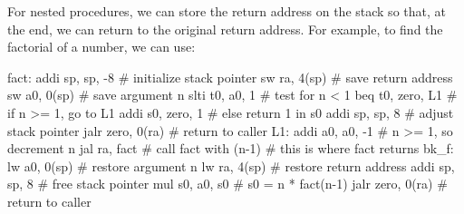 For nested procedures, we can store the return address on the stack so that, at the end, we can return to the original return address. For example, to find the factorial of a number, we can use:
\begin{codeLargeBlock}
fact: 
      addi sp, sp, -8     # initialize stack pointer
      sw ra, 4(sp)        # save return address
      sw a0, 0(sp)        # save argument n
      slti t0, a0, 1      # test for n < 1
      beq t0, zero, L1    # if n >= 1, go to L1
      addi s0, zero, 1    # else return 1 in s0
      addi sp, sp, 8      # adjust stack pointer
      jalr zero, 0(ra)    # return to caller
L1: 
      addi a0, a0, -1     # n >= 1, so decrement n
      jal ra, fact        # call fact with (n-1)
                          # this is where fact returns
bk_f:
      lw a0, 0(sp)        # restore argument n
      lw ra, 4(sp)        # restore return address
      addi sp, sp, 8      # free stack pointer
      mul s0, a0, s0      # s0 = n * fact(n-1)
      jalr zero, 0(ra)    # return to caller
\end{codeLargeBlock}
